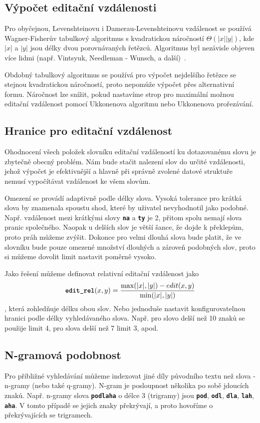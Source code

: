 \documentclass[11pt,letterpaper,oneside,openright]{book}
\newcommand{\bftt}[1]{\texttt{\textbf{#1}}}
\begin{document}

\subsection{Výpočet editační vzdálenosti}
Pro obyčejnou, Levenshteinovu i Damerau-Levenshteinovu vzdálenost se používá
Wagner-Fisherův tabulkový algoritmus s kvadratickou náročností
$\Theta(|x||y|)$, kde $|x|$ a $|y|$ jsou délky dvou porovnávaných řetězců.
Algoritmus byl nezávisle objeven více lidmi (např. Vintsyuk, Needleman -
Wunsch, a další)~\cite{Navarro:2001:GTA:375360.375365}.

Obdobný tabulkový algoritmus se používá pro výpočet nejdelšího řetězce se
stejnou kvadratickou náročností, proto nepomůže výpočet přes alternativní
formu. Náročnost lze snížit, pokud nastavíme strop pro maximální možnou
editační vzdálenost pomocí Ukkonenova algoritmu nebo Ukkonenova prořezávání.

\subsection{Hranice pro editační vzdálenost}
Ohodnocení všech položek slovníku editační vzdáleností ku dotazovanému slovu je
zbytečně obecný problém. Nám bude stačit nalezení slov do určité vzdálenosti,
jehož výpočet je efektivnější a hlavně při správně zvolené datové struktuře
nemusí vypočítávat vzdálenost ke všem slovům.

Omezení se provádí adaptivně podle délky slova. Vysoká tolerance pro krátká
slova by znamenala spoustu shod, které by uživatel nevyhodnotil jako podobné.
Např. vzdálenost mezi krátkými slovy \bftt{na} a \bftt{ty} je 2, přitom spolu
nemají slova pranic společného. Naopak u delších slov je větší šance, že dojde
k překlepům, proto práh můžeme zvýšit. Dokonce pro velmi dlouhá slova bude
platit, že ve slovníku bude pouze omezené množství dlouhých a zároveň podobných
slov, proto si můžeme dovolit limit nastavit poměrně vysoko. 

Jako řešení můžeme definovat relativní editační vzdálenost jako
\[\bftt{edit\_rel}(x, y) = \frac{\max (|x|, |y|) - edit(x, y)}{\min (|x|,
|y|)}\], která zohledňuje délku obou slov. Nebo jednoduše nastavit
konfigurovatelnou hranici podle délky vyhledávaného slova. Např. pro slovo
delší než 10 znaků se použije limit 4, pro slova delší než 7 limit 3, apod.




\subsection{N-gramová podobnost}
Pro přibližné vyhledávání můžeme indexovat jiné díly původního textu než slova
- n-gramy (nebo také q-gramy). N-gram je posloupnost několika po sobě jdoucích
znaků. Např. n-gramy slova \bftt{podlaha} o délce 3 (trigramy) jsou \bftt{pod},
\bftt{odl}, \bftt{dla}, \bftt{lah}, \bftt{aha}. V tomto případě se jejich znaky
překrývají, a proto hovoříme o překrývajících se trigramech.
\end{document}
